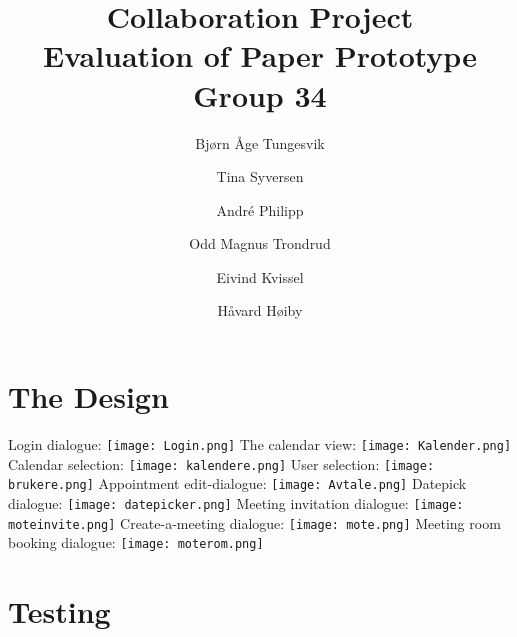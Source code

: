 \documentclass{article}
\begin{document}
\begin{titlepage}
\title{Collaboration Project\\
\textbf{Evaluation of Paper Prototype}\\
Group 34}
\author{Bj\o rn \AA ge Tungesvik\and Tina Syversen\and Andr\'e Philipp\and Odd Magnus Trondrud\and Eivind Kvissel\and H\aa vard H\o iby}
\maketitle
\end{titlepage}
\newpage
\part{The Design}

Login dialogue: \newline \texttt{[image: Login.png]}\newline
The calendar view: \newline \texttt{[image: Kalender.png]}\newline
Calendar selection: \newline \texttt{[image: kalendere.png]}\newline
User selection: \newline \texttt{[image: brukere.png]}\newline
Appointment edit-dialogue: \newline \texttt{[image: Avtale.png]}\newline
Datepick dialogue: \newline \texttt{[image: datepicker.png]}\newline
Meeting invitation dialogue: \newline \texttt{[image: moteinvite.png]}%
\newline
Create-a-meeting dialogue: \newline \texttt{[image: mote.png]}\newline
Meeting room booking dialogue: \newline \texttt{[image: moterom.png]}%
\newline
\newpage
\part{Testing}
\end{document}

